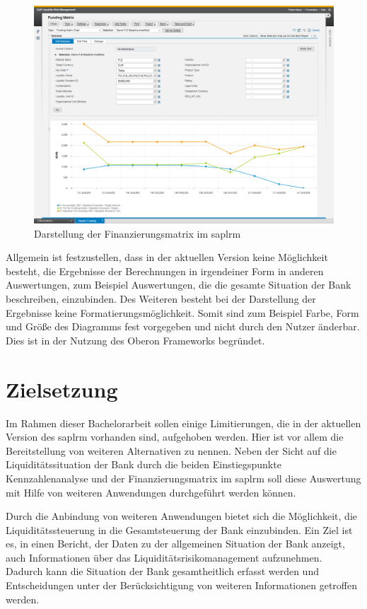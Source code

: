 \begin{onehalfspacing}
\begin{figure}[ht]
\centering
\setlength{\unitlength}{1mm}
\includegraphics[width=15cm]{images/Funding_Matrix_Example-crop.png}
\caption{Darstellung der Finanzierungsmatrix im \gls{saplrm}\label{fig:lrm_istzustand_fundingmatrix}}
\end{figure} 

Allgemein ist festzustellen, dass in der aktuellen Version keine Möglichkeit besteht, die Ergebnisse der Berechnungen in irgendeiner Form in anderen Auswertungen, zum Beispiel Auswertungen, die die gesamte Situation der Bank beschreiben, einzubinden. Des Weiteren besteht bei der Darstellung der Ergebnisse keine Formatierungsmöglichkeit. Somit sind zum Beispiel Farbe, Form und Größe des Diagramms fest vorgegeben und nicht durch den Nutzer änderbar. Dies ist in der Nutzung des Oberon Frameworks begründet.

\section{Zielsetzung}
\label{sec:zielsetzung}

Im Rahmen dieser Bachelorarbeit sollen einige Limitierungen, die in der aktuellen Version des \gls{saplrm} vorhanden sind, aufgehoben werden. Hier ist vor allem die Bereitstellung von weiteren Alternativen zu nennen. Neben der Sicht auf die Liquiditätssituation der Bank durch die beiden Einstiegspunkte Kennzahlenanalyse und der Finanzierungsmatrix im \gls{saplrm} soll diese Auswertung mit Hilfe von weiteren Anwendungen durchgeführt werden können.

Durch die Anbindung von weiteren Anwendungen bietet sich die Möglichkeit, die Liquiditätssteuerung in die Gesamtsteuerung der Bank einzubinden. Ein Ziel ist es, in einen Bericht, der Daten zu der allgemeinen Situation der Bank anzeigt, auch Informationen über das Liquiditätsrisikomanagement aufzunehmen. Dadurch kann die Situation der Bank gesamtheitlich erfasst werden und Entscheidungen unter der Berücksichtigung von weiteren Informationen getroffen werden.


\end{onehalfspacing}
